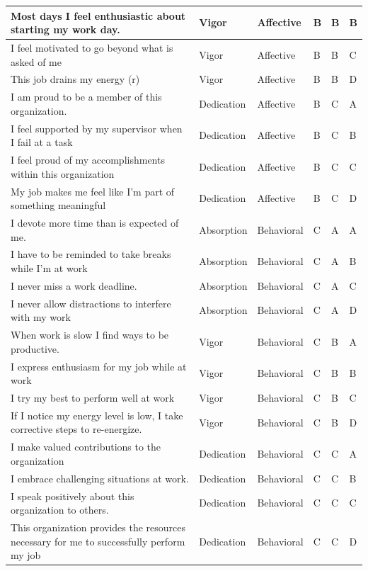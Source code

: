 \documentclass[
]{book}
\begin{document}
\begin{table}
\begin{tabular}[t]{l|l|l|l|l|l}
\hline
Most days I feel enthusiastic about starting my work day. & Vigor & Affective & B & B & B\\
\hline
I feel motivated to go beyond what is asked of me & Vigor & Affective & B & B & C\\
\hline
This job drains my energy (r) & Vigor & Affective & B & B & D\\
\hline
I am proud to be a member of this organization. & Dedication & Affective & B & C & A\\
\hline
I feel supported by my supervisor when I fail at a task & Dedication & Affective & B & C & B\\
\hline
I feel proud of my accomplishments within this organization & Dedication & Affective & B & C & C\\
\hline
My job makes me feel like I’m part of something meaningful & Dedication & Affective & B & C & D\\
\hline
I devote more time than is expected of me. & Absorption & Behavioral & C & A & A\\
\hline
I have to be reminded to take breaks while I’m at work & Absorption & Behavioral & C & A & B\\
\hline
I never miss a work deadline. & Absorption & Behavioral & C & A & C\\
\hline
I never allow distractions to interfere with my work & Absorption & Behavioral & C & A & D\\
\hline
When work is slow I find ways to be productive. & Vigor & Behavioral & C & B & A\\
\hline
I express enthusiasm for my job while at work & Vigor & Behavioral & C & B & B\\
\hline
I try my best to perform well at work & Vigor & Behavioral & C & B & C\\
\hline
If I notice my energy level is low, I take corrective steps to re-energize. & Vigor & Behavioral & C & B & D\\
\hline
I make valued contributions to the organization & Dedication & Behavioral & C & C & A\\
\hline
I embrace challenging situations at work. & Dedication & Behavioral & C & C & B\\
\hline
I speak positively about this organization to others. & Dedication & Behavioral & C & C & C\\
\hline
This organization provides the resources necessary for me to successfully perform my job & Dedication & Behavioral & C & C & D\\
\hline
\end{tabular}
\end{table}
\end{document}
